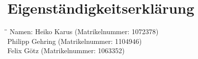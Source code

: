 \documentclass[
a4paper,
11pt,
headsepline,           %
oneside,               %
numbers=noenddot,	   %
bibliography=totoc,    %
]{scrbook}
\newcounter{SeitenzahlSpeicher}
\newcommand{\Heiko}{Heiko Karus}
\newcommand{\Philipp}{Philipp Gehring}
\newcommand{\Felix}{Felix Götz}
\newcommand{\Hmatnr}{1072378}
\newcommand{\Pmatnr}{1104946}
\newcommand{\Fmatnr}{1063352}
\begin{document}
\clearpage
\appendix
{}
\setcounter{page}{\theSeitenzahlSpeicher}




\backmatter

\clearpage
\printbibliography

\clearpage
\lstlistoflistings
{}




%

%

\clearpage
\thispagestyle{empty}
\chapter{Eigenständigkeitserklärung}

\begin{tabbing}
\hspace{30mm}\=\hspace{60mm}\=\kill
Namen: \> \Heiko \> (Matrikelnummer: \Hmatnr) \\ 
  \>  \Philipp \> (Matrikelnummer: \Pmatnr) \\ 
  \>  \Felix \> (Matrikelnummer: \Fmatnr)
\end{tabbing} 

\end{document}
